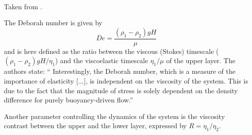\begin{center}
\\
{\captionfont Taken from \textcite{kabe07}.}
\end{center}

The Deborah number is given by
\[
De=\frac{(\rho_1-\rho_2)g H}{\mu}
\]
and is here defined as the ratio between the viscous (Stokes) timescale ($(\rho_1-\rho_2)g H/\eta_1$)
and the viscoelastic timescale $\eta_1/\mu$ of the upper layer.
The authors state: ``
Interestingly, the Deborah number, which is a measure of the importance of
elasticity [...], is independent on the viscosity of the system. 
This is due to the fact that the magnitude of stress is solely
dependent on the density difference for purely buoyancy-driven flow.''

Another parameter controlling the dynamics of the system is the viscosity contrast 
between the upper and the lower layer, expressed by $R=\eta_1/\eta_2$.


\newpage

